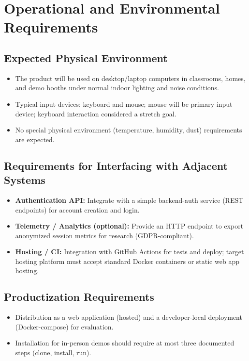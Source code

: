 \documentclass[12pt]{article}
\begin{document}
\section{Operational and Environmental Requirements}

\subsection{Expected Physical Environment}
\begin{itemize}
  \item The product will be used on desktop/laptop computers in classrooms, homes, and demo booths under normal indoor lighting and noise conditions.
  \item Typical input devices: keyboard and mouse; mouse will be primary input device; keyboard interaction considered a stretch goal.
  \item No special physical environment (temperature, humidity, dust) requirements are expected.
\end{itemize}

\subsection{Requirements for Interfacing with Adjacent Systems}
\begin{itemize}
  \item \textbf{Authentication API:} Integrate with a simple backend-auth service (REST endpoints) for account creation and login.
  \item \textbf{Telemetry / Analytics (optional):} Provide an HTTP endpoint to export anonymized session metrics for research (GDPR-compliant).
  \item \textbf{Hosting / CI:} Integration with GitHub Actions for tests and deploy; target hosting platform must accept standard Docker containers or static web app hosting.
\end{itemize}

\subsection{Productization Requirements}
\begin{itemize}
  \item Distribution as a web application (hosted) and a developer-local deployment (Docker-compose) for evaluation.
  \item Installation for in-person demos should require at most three documented steps (clone, install, run).
\end{itemize}
\end{document}
